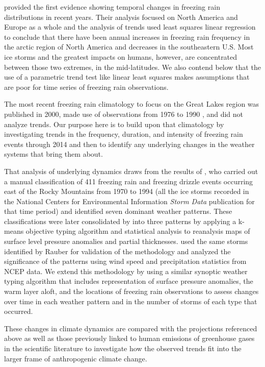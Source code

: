 \documentclass[twocol]{ametsoc}
\begin{document}
\citet{groisman2016recent} provided the first evidence showing temporal changes in freezing rain distributions in recent years. Their analysis focused on North America and Europe as a whole and the analysis of trends used least squares linear regression to conclude that there have been annual increases in freezing rain frequency in the arctic region of North America and decreases in the southeastern U.S. Most ice storms and the greatest impacts on humans, however, are concentrated between those two extremes, in the mid-latitudes. We also contend below that the use of a parametric trend test like linear least squares makes assumptions that are poor for time series of freezing rain observations.

The most recent freezing rain climatology to focus on the Great Lakes region was published in 2000, made use of observations from 1976 to 1990 \citep{cortinas2000climatology}, and did not analyze trends. Our purpose here is to build upon that climatology by investigating trends in the frequency, duration, and intensity of freezing rain events through 2014 and then to identify any underlying changes in the weather systems that bring them about. 

That analysis of underlying dynamics draws from the results of \citet{rauber2001synoptic}, who carried out a manual classification of 411 freezing rain and freezing drizzle events occurring east of the Rocky Mountains from 1970 to 1994 (all the ice storms recorded in the National Centers for Environmental Information \textit{Storm Data} publication for that time period) and identified seven dominant weather patterns. These classifications were later consolidated by \citet{erfani2012automated} into three patterns by applying a k-means objective typing algorithm and statistical analysis to reanalysis maps of surface level pressure anomalies and partial thicknesses. \citet{erfani2012automated} used the same storms identified by Rauber for validation of the methodology and analyzed the significance of the patterns using wind speed and precipitation statistics from NCEP data. We extend this methodology by using a similar synoptic weather typing algorithm that includes representation of surface pressure anomalies, the warm layer aloft, and the locations of freezing rain observations to assess changes over time in each weather pattern and in the number of storms of each type that occurred.

These changes in climate dynamics are compared with the projections referenced above as well as those previously linked to human emissions of greenhouse gases in the scientific literature to investigate how the observed trends fit into the larger frame of anthropogenic climate change.
\end{document}

